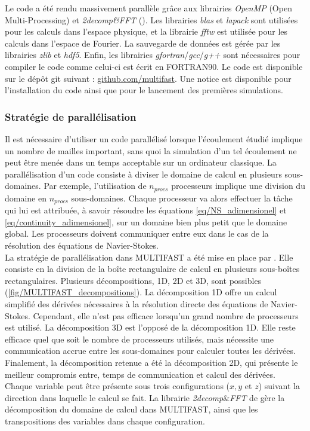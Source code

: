 Le code a été rendu massivement parallèle grâce aux librairies \textit{OpenMP} (Open Multi-Processing) et \textit{2decomp\&FFT} (\cite{2decomp2010}). Les librairies \textit{blas} et \textit{lapack} sont utilisées pour les calculs dans l'espace physique, et la librairie \textit{fftw} est utilisée pour les calculs dans l'espace de Fourier. La sauvegarde de données est gérée par les librairies \textit{zlib} et \textit{hdf5}. Enfin, les librairies \textit{gfortran}/\textit{gcc}/\textit{g++} sont nécessaires pour compiler le code comme celui-ci est écrit en FORTRAN90. Le code est disponible sur le dépôt git suivant : \href{https://github.com/Benji12358/multifast/tree/multifast++}{github.com/multifast}. Une notice est disponible pour l'installation du code ainsi que pour le lancement des premières simulations.

\subsubsection{Stratégie de parallélisation}

Il est nécessaire d'utiliser un code parallélisé lorsque l'écoulement étudié implique un nombre de mailles important, sans quoi la simulation d'un tel écoulement ne peut être menée dans un temps acceptable sur un ordinateur classique. La parallélisation d'un code consiste à diviser le domaine de calcul en plusieurs sous-domaines. Par exemple, l'utilisation de $n_{procs}$ processeurs implique une division du domaine en $n_{procs}$ sous-domaines. Chaque processeur va alors effectuer la tâche qui lui est attribuée, à savoir résoudre les équations \ref{eq/NS_adimensionel} et \ref{eq/continuity_adimensionel}, sur un domaine bien plus petit que le domaine global. Les processeurs doivent communiquer entre eux dans le cas de la résolution des équations de Navier-Stokes.\\ 

La stratégie de parallélisation dans MULTIFAST a été mise en place par \cite{Bauer_PhDThesis}. Elle consiste en la division de la boîte rectangulaire de calcul en plusieurs sous-boîtes rectangulaires. Plusieurs décompositions, 1D, 2D et 3D, sont possibles (\cref{fig/MULTIFAST_decompositions}). La décomposition 1D offre un calcul simplifié des dérivées nécessaires à la résolution directe des équations de Navier-Stokes. Cependant, elle n'est pas efficace lorsqu'un grand nombre de processeurs est utilisé. La décomposition 3D est l'opposé de la décomposition 1D. Elle reste efficace quel que soit le nombre de processeurs utilisés, mais nécessite une communication accrue entre les sous-domaines pour calculer toutes les dérivées. Finalement, la décomposition retenue a été la décomposition 2D, qui présente le meilleur compromis entre, temps de communication et calcul des dérivées. Chaque variable peut être présente sous trois configurations ($x,y$ et $z$) suivant la direction dans laquelle le calcul se fait. La librairie \textit{2decomp$\&$FFT} de \cite{2decomp2010} gère la décomposition du domaine de calcul dans MULTIFAST, ainsi que les transpositions des variables dans chaque configuration.\\

